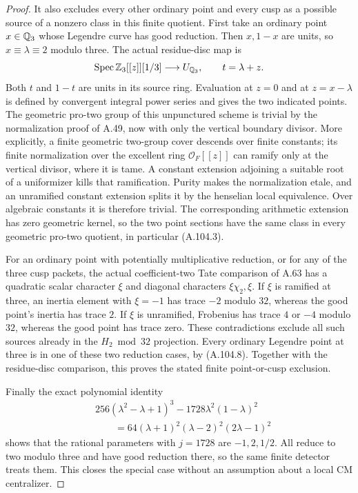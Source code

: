 \begin{proof}
It also excludes every other ordinary point
and every cusp as a possible source of a
nonzero class in this finite quotient.
First take an ordinary point $x\in\mathbb Q_3$
whose Legendre curve has good reduction.
Then $x,1-x$ are units, so $x\equiv\lambda\equiv2$
modulo three.  The actual residue-disc map is
\[
 \operatorname{Spec}\mathbb Z_3[[z]][1/3]\longrightarrow U_{\mathbb Q_3},
                           \qquad t=\lambda+z.
\]
Both $t$ and $1-t$ are units in its source
ring.  Evaluation at $z=0$ and at
$z=x-\lambda$ is defined by convergent
integral power series and gives the two
indicated points.
The geometric pro-two group of this
unpunctured scheme is trivial by the
normalization proof of A.49, now with
only the vertical boundary divisor.
More explicitly, a finite geometric
two-group cover descends over finite
constants; its finite normalization
over the excellent ring $\mathcal O_F[[z]]$
can ramify only at the vertical divisor,
where it is tame.  A constant extension
adjoining a suitable root of a uniformizer
kills that ramification.  Purity makes the
normalization etale, and an unramified
constant extension splits it by the
henselian local equivalence.
Over algebraic constants it is therefore
trivial.  The corresponding arithmetic
extension has zero geometric kernel,
so the two point sections have the same
class in every geometric pro-two quotient,
in particular (A.104.3).

For an ordinary point with potentially
multiplicative reduction, or for any
of the three cusp packets, the actual
coefficient-two Tate comparison of A.63
has a quadratic scalar character $\xi$
and diagonal characters $\xi\chi_2,\xi$.
If $\xi$ is ramified at three, an inertia
element with $\xi=-1$ has trace $-2$
modulo $32$, whereas the good point's
inertia has trace $2$.
If $\xi$ is unramified, Frobenius has
trace $4$ or $-4$ modulo $32$, whereas
the good point has trace zero.
These contradictions exclude all such
sources already in the $H_2\bmod32$
projection.  Every ordinary Legendre
point at three is in one of these two
reduction cases, by (A.104.8).
Together with the residue-disc comparison,
this proves the stated finite point-or-cusp
exclusion.

Finally the exact polynomial identity
\[
 \begin{split}
  &256(\lambda^2-\lambda+1)^3
       -1728\lambda^2(1-\lambda)^2\\
       &\hspace{2em}=64(\lambda+1)^2(\lambda-2)^2(2\lambda-1)^2
 \end{split}
\tag{A.104.16}
\]
shows that the rational parameters
with $j=1728$ are $-1,2,1/2$.
All reduce to two modulo three and
have good reduction there, so the
same finite detector treats them.
This closes the special case without
an assumption about a local CM
centralizer.


\end{proof}

